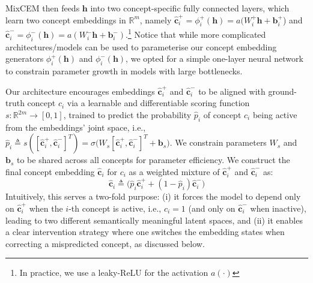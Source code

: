 MixCEM then feeds $\mathbf{h}$ into two concept-specific fully connected layers, which learn two concept embeddings in $\mathbb{R}^m$, namely $\hat{\mathbf{c}}^+_i = \phi^+_i(\mathbf{h}) = a(W^+_i\mathbf{h} + \mathbf{b}^+_i$) and $\hat{\mathbf{c}}^-_i = \phi^-_i(\mathbf{h}) = a(W^-_i\mathbf{h} + \mathbf{b}^-_i)$.\footnote{In practice, we use a leaky-ReLU for the activation $a(\cdot)$} Notice that while more complicated architectures/models can be used to parameterise our concept embedding generators $\phi^+_i(\mathbf{h})$ and $\phi^-_i(\mathbf{h})$, we opted for a simple one-layer neural network to constrain parameter growth in models with large bottlenecks.

Our architecture encourages embeddings $\hat{\mathbf{c}}^+_i$ and $\hat{\mathbf{c}}^-_i$ to be aligned with ground-truth concept $c_i$ via a learnable and differentiable scoring function $s: \mathbb{R}^{2 m} \rightarrow [0, 1]$, trained to predict the probability $\hat{p}_i$ of concept $c_i$ being active from the embeddings' joint space, i.e., $\hat{p}_i \triangleq s([\hat{\mathbf{c}}^+_i, \hat{\mathbf{c}}^-_i]^T) =  \sigma\big(W_s[\hat{\mathbf{c}}^+_i, \hat{\mathbf{c}}^-_i]^T + \mathbf{b}_s\big)$. We constrain parameters $W_s$ and $\mathbf{b}_s$ to be shared across all concepts for parameter efficiency.
We construct the final concept embedding $\hat{\mathbf{c}}_i$ for $c_i$ as a weighted mixture of $\hat{\mathbf{c}}^+_i$ and $\hat{\mathbf{c}}^-_i$ as:
\[
\hat{\mathbf{c}}_i \triangleq \big(\hat{p}_i \hat{\mathbf{c}}^+_i + (1 - \hat{p}_i) \hat{\mathbf{c}}^-_i \big)
\]
Intuitively, this serves a two-fold purpose: (i) it forces the model to depend only on $\hat{\mathbf{c}}^+_i$ when the $i$-th concept is active, i.e., $c_i = 1$ (and only on $\hat{\mathbf{c}}^-_i$ when inactive), leading to two different semantically meaningful latent spaces, and (ii) it enables a clear intervention strategy where one switches the embedding states when correcting a mispredicted concept, as discussed below.

